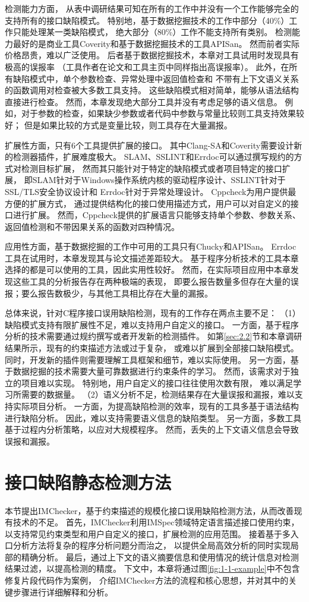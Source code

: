 检测能力方面，
从表中调研结果可知在所有的工作中并没有一个工作能够完全的支持所有的接口缺陷模式。
特别地，基于数据挖掘技术的工作中部分（40\%）工作只能处理某一类缺陷模式，
绝大部分（80\%）工作不能支持所有类别。
检测能力最好的是商业工具Coverity和基于数据挖掘技术的工具APISan。
然而前者实际价格昂贵，难以广泛使用。
后者基于数据挖掘技术，本章对工具试用时发现具有极高的误报率
（工具作者在论文和工具主页中同样指出高误报率）。
此外，在所有缺陷模式中，单个参数检查、异常处理中返回值检查和
不带有上下文语义关系的函数调用对检查被大多数工具支持。
这些缺陷模式相对简单，能够从语法结构直接进行检查。
然而，本章发现绝大部分工具并没有考虑足够的语义信息。
例如，对于参数的检查，如果缺少参数或者代码中参数与常量比较则工具支持效果较好；
但是如果比较的方式是变量比较，则工具存在大量漏报。

扩展性方面，只有6个工具提供扩展的接口。
其中Clang-SA和Coverity需要设计新的检测器插件，扩展难度极大。
SLAM、SSLINT和Errdoc可以通过撰写规约的方式对检测目标扩展，
然而其只能针对于特定的缺陷模式或者项目特定的接口扩展，
即SLAM针对于Windows操作系统内核的驱动程序设计、SSLINT针对于SSL/TLS安全协议设计和
Errdoc针对于异常处理设计。
Cppcheck为用户提供最方便的扩展方式，
通过提供结构化的接口使用描述方式，用户可以对自定义的接口进行扩展。
然而，Cppcheck提供的扩展语言只能够支持单个参数、参数关系、返回值检测和不带因果关系的函数对四种情况。

应用性方面，基于数据挖掘的工作中可用的工具只有Chucky和APISan。
Errdoc工具在试用时，本章发现其与论文描述差距较大。
基于程序分析技术的工具本章选择的都是可以使用的工具，因此实用性较好。
然而，在实际项目应用中本章发现这些工具的分析报告存在两种极端的表现，
即要么报告数量多但存在大量的误报；要么报告数极少，与其他工具相比存在大量的漏报。

总体来说，针对C程序接口误用缺陷检测，现有的工作存在两点主要不足：
（1）缺陷模式支持有限扩展性不足，难以支持用户自定义的接口。
一方面，基于程序分析的技术需要通过规约撰写或者开发新的检测插件。
如第\ref{sec:2.2}节和本章调研结果所示，现有的约束描述方法或过于复杂，
或难以扩展到全部接口缺陷模式。
同时，开发新的插件则需要理解工具框架和细节，难以实际使用。
另一方面，基于数据挖掘的技术需要大量可靠数据进行约束条件的学习。
然而，该需求对于独立的项目难以实现。
特别地，用户自定义的接口往往使用次数有限，
难以满足学习所需要的数据量。
（2）语义分析不足，检测结果存在大量误报和漏报，难以支持实际项目分析。
一方面，为提高缺陷检测的效率，现有的工具多基于语法结构进行缺陷分析。
因此，难以支持需要语义信息的缺陷类型。
另一方面，多数工具基于过程内分析策略，以应对大规模程序。
然而，丢失的上下文语义信息会导致误报和漏报。

\section{接口缺陷静态检测方法}
\label{sec:3.3}
本节提出IMChecker，基于约束描述的规模化接口误用缺陷检测方法，从而改善现有技术的不足。
首先，IMChecker利用IMSpec领域特定语言描述接口使用约束，
以支持常见约束类型和用户自定义的接口，扩展检测的应用范围。
接着基于多入口分析方法将复杂的程序分析问题分而治之，
以提供全局高效分析的同时实现局部的精确分析。
最后，通过上下文的语义摘要信息和使用情况的统计信息对检测结果过滤，以提高检测的精度。
下文中，本章将通过图\ref{fig:1-1-example}中不包含修复片段代码作为案例，
介绍IMChecker方法的流程和核心思想，并对其中的关键步骤进行详细解释和分析。

